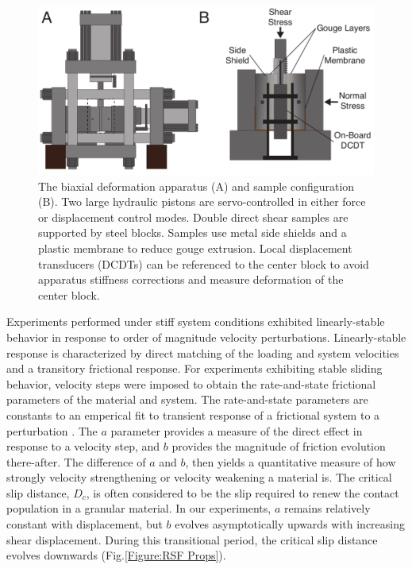 \documentclass[11pt]{article}
\begin{document}
\begin{figure}
    \centering
    \includegraphics[scale=0.5]{../Figures/Fig_Biax_Schematic/biax_schematic.pdf}
       \caption{The biaxial deformation apparatus (A) and sample configuration (B).
       Two large hydraulic pistons are servo-controlled in either force or
       displacement control modes. Double direct shear samples are supported by
       steel blocks. Samples use metal side shields and a plastic membrane to
       reduce gouge extrusion.  Local displacement transducers (DCDTs) can be
       referenced to the center block to avoid apparatus stiffness corrections and
       measure deformation of the center block.}
      \label{Fig:Biax Schematic}
\end{figure}

Experiments performed under stiff system conditions exhibited linearly-stable
behavior in response to order of magnitude velocity perturbations.
Linearly-stable response is characterized by direct matching of the loading and
system velocities and a transitory frictional response.
For experiments exhibiting stable sliding behavior, velocity steps were imposed
to obtain the rate-and-state frictional parameters of the material and system.
The rate-and-state parameters are constants to an emperical fit to transient
response of a frictional system to a perturbation \cite{Marone:1998}. The $a$
parameter provides a measure of the direct effect in response to a velocity
step, and $b$ provides the magnitude of friction evolution there-after. The
difference of $a$ and $b$, then yields a quantitative measure of how strongly
velocity strengthening or velocity weakening a material is. The critical slip
distance, $D_c$, is often considered to be the slip required to renew the
contact population in a granular material. In our experiments, $a$ remains
relatively constant with displacement, but $b$ evolves asymptotically upwards
with increasing shear displacement. During this transitional period, the
critical slip distance evolves downwards (Fig.\ref{Figure:RSF Props}).
\end{document}
